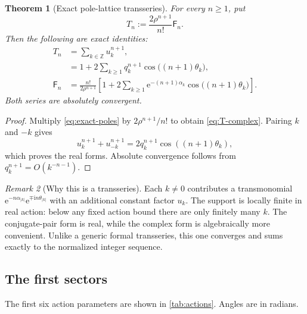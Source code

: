 \documentclass[11pt,a4paper,oneside]{article}
\newtheorem{theorem}{Theorem}[section]
\theoremstyle{definition}
\theoremstyle{remark}
\newtheorem{remark}[theorem]{Remark}
\newcommand{\Fub}{\mathsf{F}}
\newcommand{\e}{\mathrm{e}}
\newcommand{\ii}{\mathrm{i}}
\begin{document}
\begin{theorem}[Exact pole-lattice transseries]\label{thm:exact-transseries}
For every $n\ge1$, put
\[
 T_n:=\frac{2\rho^{n+1}}{n!}\Fub_n.
\]
Then the following are exact identities:
\begin{align}
 T_n
 &=\sum_{k\in\mathbb Z}u_k^{n+1},\label{eq:T-complex}\\
 &=1+2\sum_{k\ge1}q_k^{n+1}
       \cos\!\bigl((n+1)\theta_k\bigr),\label{eq:T-real}\\
 \Fub_n
 &=\frac{n!}{2\rho^{n+1}}
   \left[1+2\sum_{k\ge1}\e^{-(n+1)\alpha_k}
       \cos\!\bigl((n+1)\theta_k\bigr)\right].
 \label{eq:exact-real-transseries}
\end{align}
Both series are absolutely convergent.
\end{theorem}

\begin{proof}
Multiply \cref{eq:exact-poles} by $2\rho^{n+1}/n!$ to obtain
\cref{eq:T-complex}.  Pairing $k$ and $-k$ gives
\[
 u_k^{n+1}+u_{-k}^{n+1}
 =2q_k^{n+1}\cos((n+1)\theta_k),
\]
which proves the real forms.  Absolute convergence follows from
$q_k^{n+1}=O(k^{-n-1})$.
\end{proof}

\begin{remark}[Why this is a transseries]
Each $k\ne0$ contributes a transmonomial
\(
 \e^{-n\alpha_{|k|}}\e^{\mp\ii n\theta_{|k|}}
\)
with an additional constant factor $u_k$.  The support is locally finite in
real action: below any fixed action bound there are only finitely many $k$.
The conjugate-pair form is real, while the complex form is algebraically more
convenient.  Unlike a generic formal transseries, this one converges and sums
exactly to the normalized integer sequence.
\end{remark}

\subsection{The first sectors}
The first six action parameters are shown in \cref{tab:actions}.  Angles are in
radians.
\end{document}
